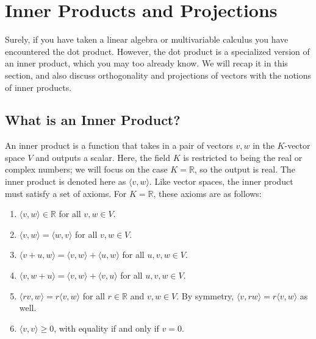 \documentclass{article}
\begin{document}
\section{Inner Products and Projections}

Surely, if you have taken a linear algebra or multivariable calculus you have encountered the dot product. However, the dot product is a specialized version of an inner product, which you may too already know. We will recap it in this section, and also discuss orthogonality and projections of vectors with the notions of inner products.

\subsection{What is an Inner Product?}

An inner product is a function that takes in a pair of vectors $v,w$ in the $K$-vector space $V$ and outputs a scalar. Here, the field $K$ is restricted to being the real or complex numbers; we will focus on the case $K = \mathbb{R}$, so the output is real. The inner product is denoted here as $\langle v,w \rangle$. Like vector spaces, the inner product must satisfy a set of axioms. For $K = \mathbb{R}$, these axioms are as follows:

\begin{enumerate}
    \item $\langle v,w \rangle \in \mathbb{R}$ for all $v,w \in V$.
    \item $\langle v,w \rangle = \langle w,v \rangle$ for all $v,w \in V$.
    \item $\langle v+u,w \rangle = \langle v,w \rangle + \langle u,w \rangle$ for all $u, v, w \in V$.
    \item $\langle v,w+u \rangle = \langle v,w \rangle + \langle v,u \rangle$ for all $u, v, w \in V$.
    \item $\langle rv,w \rangle = r\langle v,w \rangle$ for all $r \in \mathbb{R}$ and $v, w \in V$. By symmetry, $\langle v, r w \rangle = r \langle v, w \rangle$ as well.
    \item $\langle v,v \rangle \geq 0$, with equality if and only if $v=0$.
\end{enumerate}
\end{document}
